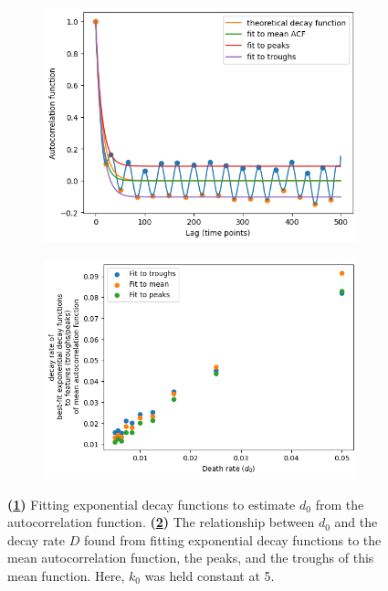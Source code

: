 \begin{figure}
  \centering
  \begin{subfigure}[t]{0.5\textwidth}
  \centering
    \includegraphics[width=\linewidth]{acf_fit_example.png}
    \caption{
    }
    \label{fig:acf-noisetimescale-effect-fit}
  \end{subfigure}%
  \begin{subfigure}[t]{0.5\textwidth}
  \centering
    \includegraphics[width=\linewidth]{deathrate_vs_decay.png}
    \caption{
    }
    \label{fig:acf-noisetimescale-effect-relationship}
  \end{subfigure}

  \caption{
    \textbf{(\ref{fig:acf-noisetimescale-effect-fit})} Fitting exponential decay functions to estimate $d_{0}$ from the autocorrelation function.
    \textbf{(\ref{fig:acf-noisetimescale-effect-relationship})} The relationship between $d_{0}$ and the decay rate $D$ found from fitting exponential decay functions to the mean autocorrelation function, the peaks, and the troughs of this mean function.
    Here, $k_{0}$ was held constant at 5.
  }
  \label{fig:acf-noisetimescale-effect}
\end{figure}

